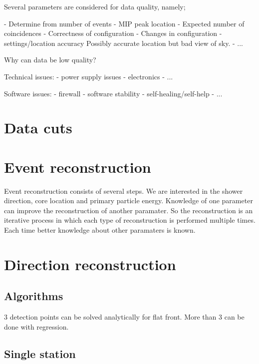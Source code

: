 Several parameters are considered for data quality, namely;

- Determine from number of events
- MIP peak location
- Expected number of coincidences
- Correctness of configuration
- Changes in configuration
- \gps settings/location accuracy
    Possibly accurate location but bad view of sky.
- ...


Why can data be low quality?

Technical issues:
- power supply issues
- electronics
- ...

Software issues:
- firewall
- software stability
- self-healing/self-help
- ...


\section{Data cuts}




\section{Event reconstruction}

Event reconstruction consists of several steps. We are interested in the
shower direction, core location and primary particle energy. Knowledge
of one  parameter can improve the reconstruction of another paramater.
So the reconstruction is an iterative process in which each type of
reconstruction is performed multiple times. Each time better knowledge
about other paramaters is known.


\section{Direction reconstruction}

\subsection{Algorithms}

3 detection points can be solved analytically for flat front.
More than 3 can be done with regression.


\subsection{Single station}


